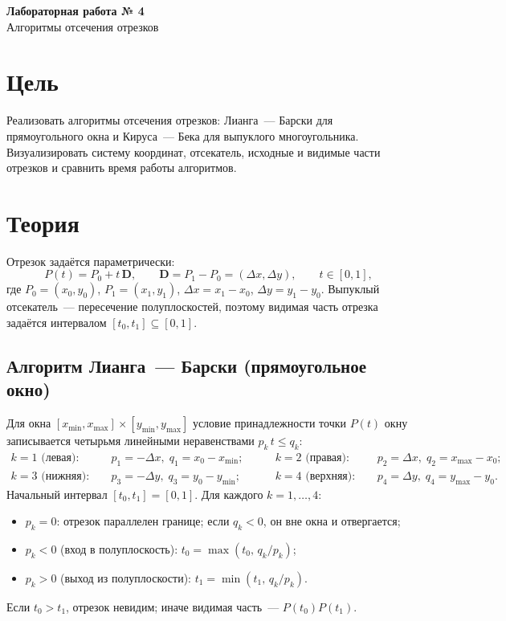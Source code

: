 \documentclass[11pt,a4paper]{article}
\begin{document}
\begin{center}
  {\LARGE\bfseries Лабораторная работа № 4}\\[0.4em]
  {\large Алгоритмы отсечения отрезков}
\end{center}

\section{Цель}
Реализовать алгоритмы отсечения отрезков: Лианга~— Барски для прямоугольного окна
и Кируса~— Бека для выпуклого многоугольника. Визуализировать систему координат,
отсекатель, исходные и видимые части отрезков и сравнить время работы алгоритмов.

\section{Теория}

Отрезок задаётся параметрически:
\[
  P(t) = P_0 + t\,\mathbf{D}, \qquad \mathbf{D} = P_1 - P_0 = (\Delta x, \Delta y), \qquad t \in [0, 1],
\]
где $P_0 = (x_0, y_0)$, $P_1 = (x_1, y_1)$, $\Delta x = x_1 - x_0$, $\Delta y = y_1 - y_0$.
Выпуклый отсекатель~— пересечение полуплоскостей, поэтому видимая часть отрезка
задаётся интервалом $[t_0, t_1] \subseteq [0, 1]$.

\subsection{Алгоритм Лианга~— Барски (прямоугольное окно)}
Для окна $[x_{\min}, x_{\max}] \times [y_{\min}, y_{\max}]$ условие принадлежности
точки $P(t)$ окну записывается четырьмя линейными неравенствами $p_k\, t \le q_k$:
\[
\begin{aligned}
  k=1\text{ (левая)}:&\quad p_1 = -\Delta x,\; q_1 = x_0 - x_{\min}; &\qquad
  k=2\text{ (правая)}:&\quad p_2 = \Delta x,\; q_2 = x_{\max} - x_0;\\
  k=3\text{ (нижняя)}:&\quad p_3 = -\Delta y,\; q_3 = y_0 - y_{\min}; &\qquad
  k=4\text{ (верхняя)}:&\quad p_4 = \Delta y,\; q_4 = y_{\max} - y_0.
\end{aligned}
\]
Начальный интервал $[t_0, t_1] = [0, 1]$. Для каждого $k = 1, \dots, 4$:
\begin{itemize}[label=--, leftmargin=1.5em, itemsep=0.1em, topsep=0.2em]
  \item $p_k = 0$: отрезок параллелен границе; если $q_k < 0$, он вне окна и отвергается;
  \item $p_k < 0$ (вход в полуплоскость): $t_0 = \max(t_0,\, q_k / p_k)$;
  \item $p_k > 0$ (выход из полуплоскости): $t_1 = \min(t_1,\, q_k / p_k)$.
\end{itemize}
Если $t_0 > t_1$, отрезок невидим; иначе видимая часть~— $P(t_0)P(t_1)$.
\end{document}
